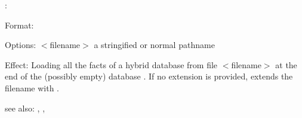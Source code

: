 :

Format: 

Options: $<$filename$>$ a stringified or normal pathname

Effect: Loading all the facts of a hybrid database from file $<$filename$>$ at the 
	end of the (possibly empty) database .
        If no extension is provided, \COLAB{} extends the filename with .

see also: \consult, \destroy, \replace
